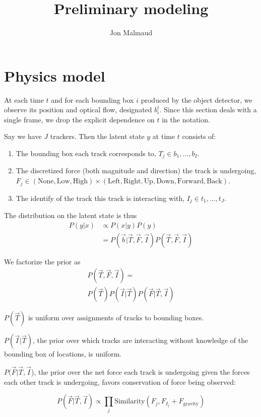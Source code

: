 \documentclass{article}
\author{Jon Malmaud}
\title{Preliminary modeling}
\begin{document}
  \maketitle
\section{Physics model}
At each time $t$ and for each bounding box $i$ produced by the object detector, we observe its position and optical flow, designated $b^t_i$. Since this section deals with a single frame, we drop the explicit dependence on $t$ in the notation.

Say we have $J$ trackers. Then the latent state $y$ at time $t$ consists of:

\begin{enumerate}
 \item The bounding box each track corresponds to, $T_j \in {b_1,\ldots,b_I}$.
 \item The discretized force (both magnitude and direction) the track is undergoing, $F_j \in {(\text{None}, \text{Low}, \text{High})} \times (\text{Left},\text{Right},\text{Up},\text{Down},\text{Forward},\text{Back})$.
 \item The identify of the track this track is interacting with, $I_j \in {t_1,\ldots,t_J}$.
\end{enumerate}

The distribution on the latent state is thus
\begin{align}
  P(y|x)&\propto P(x|y)P(y)\\
  &=P(\vec{b}|\vec{T}, \vec{F}, \vec{I})P(\vec{T},\vec{F},\vec{I})
\end{align}

We factorize the prior as
\begin{gather}
  P(\vec{T}, \vec{F}, \vec{I})=\\
  P(\vec{T})P(\vec{I}|\vec{T})P(\vec{F}|\vec{T},\vec{I})
\end{gather}

$P(\vec{T})$ is uniform over assignments of tracks to bounding boxes.

$P(\vec{I}|\vec{T})$, the prior over which tracks are interacting without knowledge of the bounding box of locations, is uniform.

$P(\vec{F}|\vec{T},\vec{I}$), the prior over the net force each track is undergoing given the forces each other track is undergoing, favors conservation of force being observed:

\begin{equation}
  P(\vec{F}|\vec{T},\vec{I})\propto \prod_j \text{Similarity}(F_j, F_{I_j}+F_\text{gravity})
\end{equation}
\end{document}
